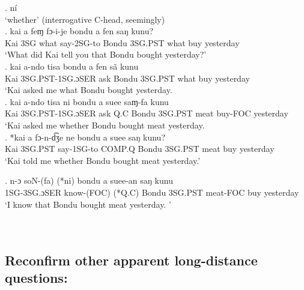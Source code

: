 \documentclass{assets/fieldnotes}
\begin{document}

\ex. ní \\
`whether' (interrogative C-head, seemingly) \\ 

\exg. kai a feɱ fɔ-i-je bondu a fen saŋ kunu?\\
Kai 3SG what say-2SG-to Bondu 3SG.PST what buy yesterday\\
`What did Kai tell you that Bondu bought yesterday?' \\

\exg. kai a-ndo tisa bondu a fen sã kunu\\
Kai 3SG.PST-1SG.ɔSER ask Bondu 3SG.PST what buy yesterday\\
`Kai asked me what Bondu bought yesterday. \\ 

\exg. kai a-ndo tisa ni bondu a suee saɱ-fa kunu\\
Kai 3SG.PST-1SG.ɔSER ask Q.C Bondu 3SG.PST meat buy-FOC yesterday\\
`Kai asked me whether Bondu bought meat yesterday.\\ 

\exg. *kai a fɔ-n-d͡ʒe ne bondu a suee saŋ kunu?\\
Kai 3SG.PST say-1SG-to COMP.Q Bondu 3SG.PST meat buy yesterday\\
`Kai told me whether Bondu bought meat yesterday.' \\


\exg. n-ɔ soN-(fa) (*ni) bondu a suee-an saŋ kunu\\
1SG-3SG.ɔSER know-(FOC) (*Q.C) Bondu 3SG.PST meat-FOC buy yesterday\\
`I know that Bondu bought meat yesterday. ' \\

\\

\\


\subsection{Reconfirm other apparent long-distance questions:}
\end{document}
